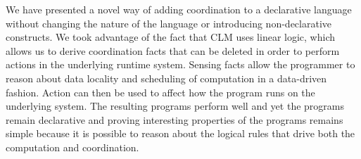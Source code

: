 We have presented a novel way of adding coordination to a declarative
language without changing the nature of the language or introducing
non-declarative constructs. We took advantage of the fact that CLM
uses linear logic, which allows us to derive coordination facts that
can be deleted in order to perform actions in the underlying runtime
system. Sensing facts allow the programmer to reason about data
locality and scheduling of computation in a data-driven fashion.
Action can then be used to affect how the program runs on the
underlying system.  The resulting programs perform well and yet the
programs remain declarative and proving interesting properties of the
programs remains simple because it is possible to reason about the
logical rules that drive both the computation and coordination.

\iffalse
We would like to explore CLM's coordination principles in distributed
systems, where data locality is far more important than in shared
memory systems.  Furthermore, we think that other declarative
paradigms such as functional programming would benefit from giving
programmers the freedom to fine-tune their programs.
\fi
